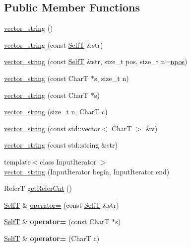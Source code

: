 \subsection*{Public Member Functions}
\begin{CompactItemize}
\item 
\hyperlink{classvector__string_074fd3f1b50a4daea063d45f9d30d32a}{vector\_\-string} ()
\item 
\hyperlink{classvector__string_0965d3e8de0658ee5223187ce1d7ff48}{vector\_\-string} (const \hyperlink{classvector__string}{SelfT} \&str)
\item 
\hyperlink{classvector__string_14f2042cf130292b381a8073fc804ccc}{vector\_\-string} (const \hyperlink{classvector__string}{SelfT} \&str, size\_\-t pos, size\_\-t n=\hyperlink{classvector__string_073b48043937e79ead0703a49426be1a}{npos})
\item 
\hyperlink{classvector__string_345f4bd7b0d68d78718a68f410fa0982}{vector\_\-string} (const CharT $\ast$s, size\_\-t n)
\item 
\hyperlink{classvector__string_00789b3e4fc51227e7e5ecd83a1a0936}{vector\_\-string} (const CharT $\ast$s)
\item 
\hyperlink{classvector__string_4ac410fc06b3114392431da64a20d898}{vector\_\-string} (size\_\-t n, CharT c)
\item 
\hyperlink{classvector__string_aa9d66b28113b5bd88d74ea674171650}{vector\_\-string} (const std::vector$<$ CharT $>$ \&v)
\item 
\hyperlink{classvector__string_30b427f9cd6bf7bc011355df355f3c1a}{vector\_\-string} (const std::string \&str)
\item 
{\footnotesize template$<$class InputIterator $>$ }\\\hyperlink{classvector__string_846b1252f511e36c8209c7122f66fb7c}{vector\_\-string} (InputIterator begin, InputIterator end)
\item 
ReferT \hyperlink{classvector__string_80e8d35e9a5ab1fc2443035e218374e8}{getReferCnt} ()
\item 
\hyperlink{classvector__string}{SelfT} \& \hyperlink{classvector__string_c7b73207a93f6131906e6938819fcfa4}{operator=} (const \hyperlink{classvector__string}{SelfT} \&str)
\item 
\hypertarget{classvector__string_7ac26736faa7bd133422e8f5b2ef6b34}{
\hyperlink{classvector__string}{SelfT} \& \textbf{operator=} (const CharT $\ast$s)}
\label{classvector__string_7ac26736faa7bd133422e8f5b2ef6b34}

\item 
\hypertarget{classvector__string_bc1a04018f3f94eb5b38ecc63e87e64a}{
\hyperlink{classvector__string}{SelfT} \& \textbf{operator=} (CharT c)}
\label{classvector__string_bc1a04018f3f94eb5b38ecc63e87e64a}


\end{CompactItemize}
